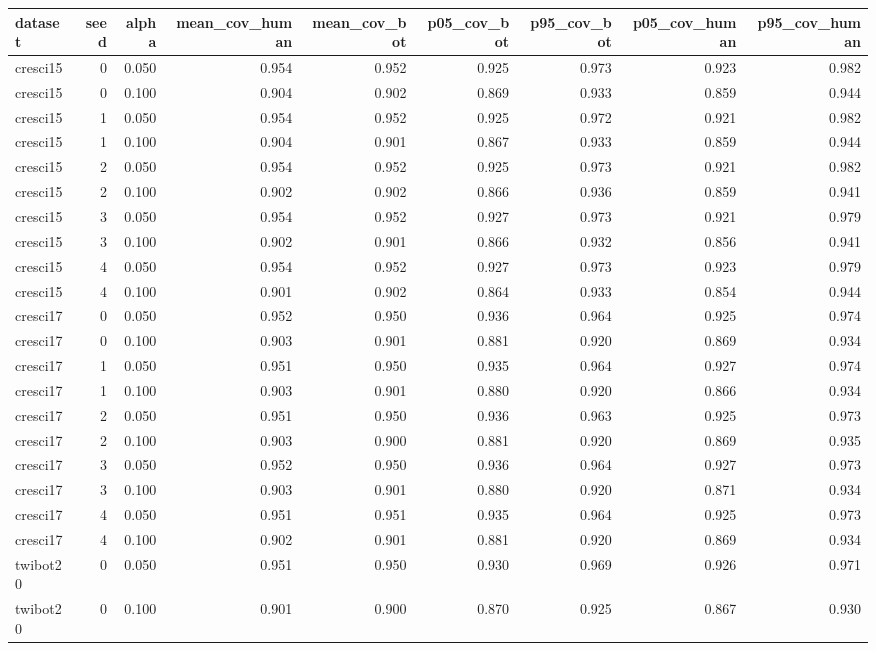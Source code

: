 \begin{tabular}{lrrrrrrrr}
\toprule
dataset & seed & alpha & mean_cov_human & mean_cov_bot & p05_cov_bot & p95_cov_bot & p05_cov_human & p95_cov_human \\
\midrule
cresci15 & 0 & 0.050 & 0.954 & 0.952 & 0.925 & 0.973 & 0.923 & 0.982 \\
cresci15 & 0 & 0.100 & 0.904 & 0.902 & 0.869 & 0.933 & 0.859 & 0.944 \\
cresci15 & 1 & 0.050 & 0.954 & 0.952 & 0.925 & 0.972 & 0.921 & 0.982 \\
cresci15 & 1 & 0.100 & 0.904 & 0.901 & 0.867 & 0.933 & 0.859 & 0.944 \\
cresci15 & 2 & 0.050 & 0.954 & 0.952 & 0.925 & 0.973 & 0.921 & 0.982 \\
cresci15 & 2 & 0.100 & 0.902 & 0.902 & 0.866 & 0.936 & 0.859 & 0.941 \\
cresci15 & 3 & 0.050 & 0.954 & 0.952 & 0.927 & 0.973 & 0.921 & 0.979 \\
cresci15 & 3 & 0.100 & 0.902 & 0.901 & 0.866 & 0.932 & 0.856 & 0.941 \\
cresci15 & 4 & 0.050 & 0.954 & 0.952 & 0.927 & 0.973 & 0.923 & 0.979 \\
cresci15 & 4 & 0.100 & 0.901 & 0.902 & 0.864 & 0.933 & 0.854 & 0.944 \\
cresci17 & 0 & 0.050 & 0.952 & 0.950 & 0.936 & 0.964 & 0.925 & 0.974 \\
cresci17 & 0 & 0.100 & 0.903 & 0.901 & 0.881 & 0.920 & 0.869 & 0.934 \\
cresci17 & 1 & 0.050 & 0.951 & 0.950 & 0.935 & 0.964 & 0.927 & 0.974 \\
cresci17 & 1 & 0.100 & 0.903 & 0.901 & 0.880 & 0.920 & 0.866 & 0.934 \\
cresci17 & 2 & 0.050 & 0.951 & 0.950 & 0.936 & 0.963 & 0.925 & 0.973 \\
cresci17 & 2 & 0.100 & 0.903 & 0.900 & 0.881 & 0.920 & 0.869 & 0.935 \\
cresci17 & 3 & 0.050 & 0.952 & 0.950 & 0.936 & 0.964 & 0.927 & 0.973 \\
cresci17 & 3 & 0.100 & 0.903 & 0.901 & 0.880 & 0.920 & 0.871 & 0.934 \\
cresci17 & 4 & 0.050 & 0.951 & 0.951 & 0.935 & 0.964 & 0.925 & 0.973 \\
cresci17 & 4 & 0.100 & 0.902 & 0.901 & 0.881 & 0.920 & 0.869 & 0.934 \\
twibot20 & 0 & 0.050 & 0.951 & 0.950 & 0.930 & 0.969 & 0.926 & 0.971 \\
twibot20 & 0 & 0.100 & 0.901 & 0.900 & 0.870 & 0.925 & 0.867 & 0.930 \\

\end{tabular}
